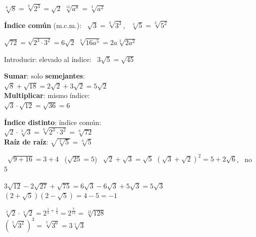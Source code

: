 \documentclass[11pt,a4paper]{article}
\newcommand{\mal}[1]{{\color{fmR}\faTimesCircle}\ {\color{fmR}\ensuremath{#1}}}
\begin{document}
\vfill
\begin{tcbraster}[raster columns=2,raster equal height,raster column skip=10pt]
\begin{tcolorbox}[fmbase,colback=fmdefbg,colframe=fmdef,coltitle=white,title={Simplificar: dividimos por el m.c.d.}]
$\sqrt[6]{8}=\sqrt[6]{2^3}=\sqrt2$ \qquad $\sqrt[12]{a^8}=\sqrt[3]{a^2}$\par\smallskip
\textbf{Índice común} (m.c.m.): \ $\sqrt3=\sqrt[6]{3^3}$, \ $\sqrt[3]5=\sqrt[6]{5^2}$
\end{tcolorbox}
\begin{tcolorbox}[fmbase,colback=fmdefbg,colframe=fmdef,coltitle=white,title={Extraer e introducir factores}]
$\sqrt{72}=\sqrt{2^3\cdot3^2}=6\sqrt2$ \qquad $\sqrt[3]{16a^5}=2a\sqrt[3]{2a^2}$\par\smallskip
Introducir: elevado al índice: \ $3\sqrt5=\sqrt{45}$
\end{tcolorbox}
\end{tcbraster}

\vfill
\begin{tcolorbox}[fmbase,colback=fmK!8,colframe=fmK,coltitle=white,title={Operaciones}]
\begin{minipage}[t]{0.5\linewidth}
\textbf{Sumar}: solo \textbf{semejantes}:\\ $\sqrt8+\sqrt{18}=2\sqrt2+3\sqrt2=5\sqrt2$\\[3pt]
\textbf{Multiplicar}: mismo índice:\\ $\sqrt3\cdot\sqrt{12}=\sqrt{36}=6$
\end{minipage}\hfill
\begin{minipage}[t]{0.47\linewidth}
\textbf{Índice distinto}: índice común:\\ $\sqrt2\cdot\sqrt[3]3=\sqrt[6]{2^3\cdot3^2}=\sqrt[6]{72}$\\[3pt]
\textbf{Raíz de raíz}: $\sqrt{\sqrt[3]{5}}=\sqrt[6]5$
\end{minipage}
\end{tcolorbox}

\vfill
\begin{compte}
\mal{\sqrt{9+16}=3+4} \ ($\sqrt{25}=5$) \qquad \mal{\sqrt2+\sqrt3=\sqrt5} \qquad $\left(\sqrt3+\sqrt2\right)^2=5+2\sqrt6$, \ no $5$
\end{compte}

\vfill
\begin{exemple}[Ejemplos]
\begin{minipage}[t]{0.48\linewidth}
$3\sqrt{12}-2\sqrt{27}+\sqrt{75}=6\sqrt3-6\sqrt3+5\sqrt3=\boxed{5\sqrt3}$\\[4pt]
$\left(2+\sqrt5\right)\left(2-\sqrt5\right)=4-5=\boxed{-1}$
\end{minipage}\hfill
\begin{minipage}[t]{0.49\linewidth}
$\sqrt[3]2\cdot\sqrt[4]2=2^{\frac13+\frac14}=2^{\frac{7}{12}}=\boxed{\sqrt[12]{128}}$\\[4pt]
$\left(\sqrt[5]{3^2}\right)^3=\sqrt[5]{3^6}=\boxed{3\sqrt[5]{3}}$
\end{minipage}
\end{exemple}
\end{document}
